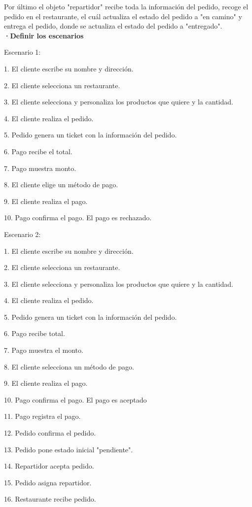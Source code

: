 \documentclass[12pt]{article}
\begin{document}
Por último el objeto "repartidor" recibe toda la información del pedido, recoge el pedido en el restaurante, el cuál actualiza el estado del pedido a "en camino" y entrega el pedido, donde se actualiza el estado del pedido a "entregado". \\

\textbf{·Definir los escenarios}

Escenario 1:

1. El cliente escribe su nombre y dirección.

2. El cliente selecciona un restaurante.

3. El cliente selecciona y personaliza los productos que quiere y la cantidad.

4. El cliente realiza el pedido.

5. Pedido genera un ticket con la información del pedido.

6. Pago recibe el total.

7. Pago muestra monto.

8. El cliente elige un método de pago.
 
9. El cliente realiza el pago.

10. Pago confirma el pago. El pago es rechazado.

Escenario 2:

1. El cliente escribe su nombre y dirección.

2. El cliente selecciona un restaurante.

3. El cliente selecciona y personaliza los productos que quiere y la cantidad.

4. El cliente realiza el pedido.

5. Pedido genera un ticket con la información del pedido.
	
6. Pago recibe total.

7. Pago muestra el monto.

8. El cliente selecciona un método de pago.

9. El cliente realiza el pago.

10. Pago confirma el pago. El pago es aceptado

11. Pago registra el pago.

12. Pedido confirma el pedido.

13. Pedido pone estado inicial "pendiente".

14. Repartidor acepta pedido.

15. Pedido asigna repartidor.

16. Restaurante recibe pedido.
\end{document}
